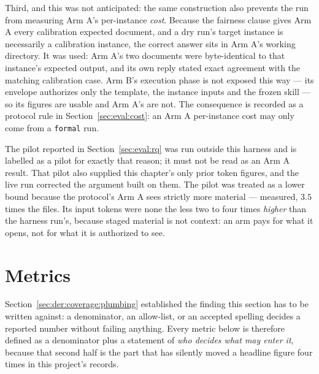 Third, and this was not anticipated: the same construction also prevents the run from
measuring Arm A's per-instance \emph{cost}. Because the fairness clause gives Arm A every
calibration expected document, and a dry run's target instance is necessarily a calibration
instance, the correct answer sits in Arm A's working directory. It was used: Arm A's two
documents were byte-identical to that instance's expected output, and its own reply stated
exact agreement with the matching calibration case. Arm B's execution phase is not exposed
this way --- its envelope authorizes only the template, the instance inputs and the frozen
skill --- so its figures are usable and Arm A's are not. The consequence is recorded as a
protocol rule in Section~\ref{sec:eval:cost}: an Arm A per-instance cost may only come from
a \texttt{formal} run.

The pilot reported in Section~\ref{sec:eval:rq} was run outside this harness and is
labelled as a pilot for exactly that reason; it must not be read as an Arm A result. That
pilot also supplied this chapter's only prior token figures, and the live run corrected the
argument built on them. The pilot was treated as a lower bound because the protocol's Arm A
sees strictly more material --- measured, $3.5$ times the files. Its input tokens were none
the less two to four times \emph{higher} than the harness run's, because staged material is
not context: an arm pays for what it opens, not for what it is authorized to see.

\section{Metrics}
\label{sec:eval:metrics}


Section~\ref{sec:der:coverage:plumbing} established the finding this section has to be
written against: a denominator, an allow-list, or an accepted spelling decides a reported
number without failing anything. Every metric below is therefore defined as a denominator
plus a statement of \emph{who decides what may enter it}, because that second half is the
part that has silently moved a headline figure four times in this project's records.

